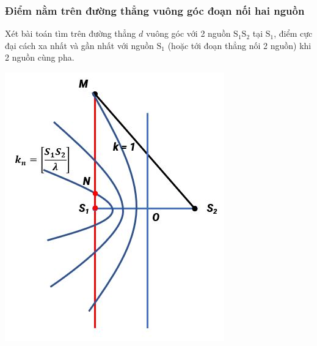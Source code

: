 \subsubsection{Điểm nằm trên đường thẳng vuông góc đoạn nối hai nguồn}
Xét bài toán tìm trên đường thẳng $d$ vuông góc với 2 nguồn $\text{S}_1\text{S}_2$ tại $\text{S}_1$, điểm cực đại cách xa nhất và gần nhất với nguồn $\text{S}_1$ (hoặc tới đoạn thẳng nối 2 nguồn) khi 2 nguồn cùng pha.
\begin{center}
	\includegraphics[scale=0.6]{../figs/VN12-PH-11-A-007-4-V2-1.JPG}
\end{center}
